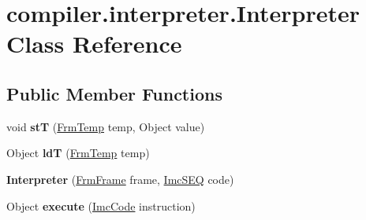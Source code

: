 \hypertarget{classcompiler_1_1interpreter_1_1_interpreter}{}\section{compiler.\+interpreter.\+Interpreter Class Reference}
\label{classcompiler_1_1interpreter_1_1_interpreter}
\subsection*{Public Member Functions}
\begin{DoxyCompactItemize}
\item 
\mbox{\label{classcompiler_1_1interpreter_1_1_interpreter_ab8d1a6629bf45942163e2fa98a91ee15}} 
void {\bfseries stT} (\hyperlink{classcompiler_1_1frames_1_1_frm_temp}{Frm\+Temp} temp, Object value)
\item 
\mbox{\label{classcompiler_1_1interpreter_1_1_interpreter_ae91896d4fa8fe1fa49344f2b6a78b0af}} 
Object {\bfseries ldT} (\hyperlink{classcompiler_1_1frames_1_1_frm_temp}{Frm\+Temp} temp)
\item 
\mbox{\label{classcompiler_1_1interpreter_1_1_interpreter_a1d6f587145ba7366c5ecd8af3931c79b}} 
{\bfseries Interpreter} (\hyperlink{classcompiler_1_1frames_1_1_frm_frame}{Frm\+Frame} frame, \hyperlink{classcompiler_1_1imcode_1_1_imc_s_e_q}{Imc\+S\+EQ} code)
\item 
\mbox{\label{classcompiler_1_1interpreter_1_1_interpreter_ad3f73c354d51944f9bdc3071f9374d32}} 
Object {\bfseries execute} (\hyperlink{interfacecompiler_1_1imcode_1_1_imc_code}{Imc\+Code} instruction)
\end{DoxyCompactItemize}
